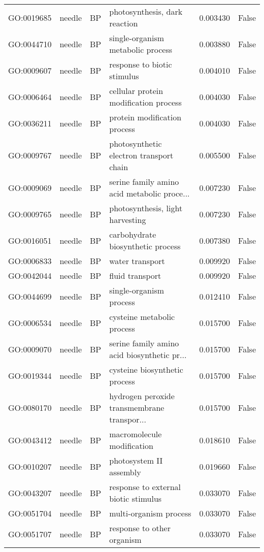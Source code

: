 \begin{longtable}{llllrl}
GO:0019685 & needle & BP &   photosynthesis, dark reaction  & 0.003430 &   False \\
GO:0044710 & needle & BP &   single-organism metabolic process  & 0.003880 &   False \\
GO:0009607 & needle & BP &   response to biotic stimulus  & 0.004010 &   False \\
GO:0006464 & needle & BP &   cellular protein modification process  & 0.004030 &   False \\
GO:0036211 & needle & BP &   protein modification process  & 0.004030 &   False \\
GO:0009767 & needle & BP &   photosynthetic electron transport chain  & 0.005500 &   False \\
GO:0009069 & needle & BP &   serine family amino acid metabolic proce...  & 0.007230 &   False \\
GO:0009765 & needle & BP &   photosynthesis, light harvesting  & 0.007230 &   False \\
GO:0016051 & needle & BP &   carbohydrate biosynthetic process  & 0.007380 &   False \\
GO:0006833 & needle & BP &   water transport  & 0.009920 &   False \\
GO:0042044 & needle & BP &   fluid transport  & 0.009920 &   False \\
GO:0044699 & needle & BP &   single-organism process  & 0.012410 &   False \\
GO:0006534 & needle & BP &   cysteine metabolic process  & 0.015700 &   False \\
GO:0009070 & needle & BP &   serine family amino acid biosynthetic pr...  & 0.015700 &   False \\
GO:0019344 & needle & BP &   cysteine biosynthetic process  & 0.015700 &   False \\
GO:0080170 & needle & BP &   hydrogen peroxide transmembrane transpor...  & 0.015700 &   False \\
GO:0043412 & needle & BP &   macromolecule modification  & 0.018610 &   False \\
GO:0010207 & needle & BP &   photosystem II assembly  & 0.019660 &   False \\
GO:0043207 & needle & BP &   response to external biotic stimulus  & 0.033070 &   False \\
GO:0051704 & needle & BP &   multi-organism process  & 0.033070 &   False \\
GO:0051707 & needle & BP &   response to other organism  & 0.033070 &   False \\

\end{longtable}
